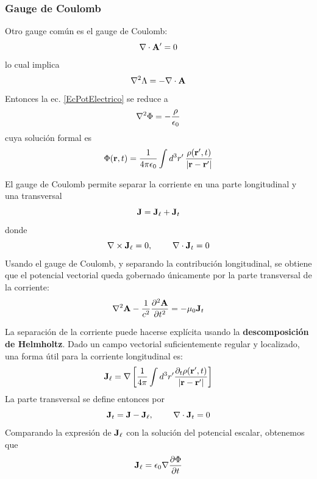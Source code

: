 \documentclass[]{article}
\numberwithin{equation}{section}
\begin{document}
\subsubsection{Gauge de Coulomb}
Otro gauge común es el gauge de Coulomb:
\begin{equation}
	\nabla\cdot\mathbf{A}' = 0 \label{gaugeCoulomb}
\end{equation}
lo cual implica
\begin{equation}
	\nabla^2\Lambda = - \nabla\cdot\mathbf{A}
\end{equation}
Entonces la ec. \ref{EcPotElectrico} se reduce a
\begin{equation*}
	\nabla^2\Phi = - \frac{\rho}{\epsilon_{0}}
\end{equation*}
cuya solución formal es
\begin{equation}
	\Phi(\rv,t) = \ke\int d^3r'\,\frac{\rho(\rv',t)}{|\rdif|}
\end{equation}

El gauge de Coulomb permite separar la corriente en una parte longitudinal y una transversal
\begin{equation}
	\mathbf{J} = \mathbf{J}_{\ell} + \mathbf{J}_{t}
\end{equation}
donde 
\begin{equation}
	\nabla\times\mathbf{J}_{\ell} = 0, ~~~~~~~ \nabla\cdot\mathbf{J}_{t} = 0
\end{equation}
Usando el gauge de Coulomb, y separando la contribución longitudinal, se obtiene que el potencial vectorial queda gobernado únicamente por la parte transversal de la corriente:
\begin{equation}
	\nabla^2\mathbf{A} - \frac{1}{c^2}\dfrac{\partial ^2\mathbf{A}}{\partial t^2} = -\mu_{0}\mathbf{J}_{t}
\end{equation}

La separación de la corriente puede hacerse explícita usando la \textbf{descomposición de Helmholtz}. Dado un campo vectorial suficientemente regular y localizado, una forma útil para la corriente longitudinal es:
\begin{equation}
	\mathbf{J}_{\ell} = \nabla\left[\frac{1}{4\pi} \int d^3r' \frac{\partial_{t} \rho(\mathbf{r}',t)}{|\mathbf{r} - \mathbf{r}'|}\right]
\end{equation}
La parte transversal se define entonces por
\begin{equation}
	\mathbf{J}_{t} = \mathbf{J} - \mathbf{J}_{\ell}, ~~~~~~~ \nabla\cdot\mathbf{J}_{t} = 0
\end{equation}
Comparando la expresión de \(\mathbf{J}_{\ell}\) con la solución del potencial escalar, obtenemos que
\begin{equation}
	\mathbf{J}_{\ell} = \epsilon_{0}\nabla\dfrac{\partial \Phi}{\partial t}
\end{equation}
\end{document}

